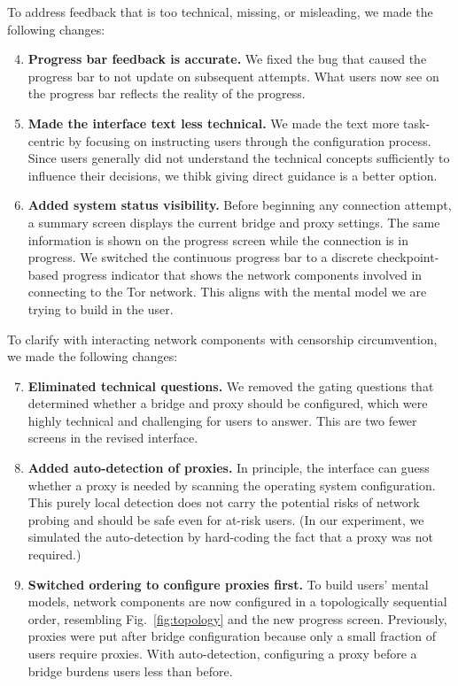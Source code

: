 \documentclass[USenglish,oneside,twocolumn]{article}
\begin{document}
To address feedback that is too technical, missing, or misleading, we made the following changes:\\ 
\begin{enumerate}
\setcounter{enumi}{3}
\item {\bfseries Progress bar feedback is accurate.}  We fixed the bug that caused the progress bar to not update on subsequent attempts. What users now see on the progress bar reflects the reality of the progress. 
\item {\bfseries Made the interface text less technical.} We made the text more task-centric by focusing on instructing users through the configuration process. Since users generally did not understand the technical concepts sufficiently to influence their decisions, we thibk giving direct guidance is a better option. 
\item {\bfseries Added system status visibility.} Before beginning any connection attempt, a summary screen displays the current bridge and proxy settings. The same information is shown on the progress screen while the connection is in progress. We switched the continuous progress bar to a discrete checkpoint-based progress indicator that shows the network components involved in connecting to the Tor network. This aligns with the mental model we are trying to build in the user.
\end{enumerate}

To clarify with interacting network components with censorship circumvention, we made the following changes:\\

\begin{enumerate}
\setcounter{enumi}{6}
\item {\bfseries Eliminated technical questions.}  We removed the gating questions that determined whether a bridge and proxy should be configured, which were highly technical and challenging for users to answer. This are two fewer screens in the revised interface. 
\item {\bfseries Added auto-detection of proxies.} In principle, the interface can guess whether a proxy is needed by scanning the operating system configuration. This purely local detection does not carry the potential risks of network probing and should be safe even for at-risk users. (In our experiment, we simulated the auto-detection by hard-coding the fact that a proxy was not required.)
\item {\bfseries Switched ordering to configure proxies first.} To build users' mental models, network components are now configured in a topologically sequential order, resembling Fig.~\ref{fig:topology} and the new progress screen. Previously, proxies were put after bridge configuration because only a small fraction of users require proxies. With auto-detection, configuring a proxy before a bridge burdens users less than before.
\end{enumerate}
\end{document}
